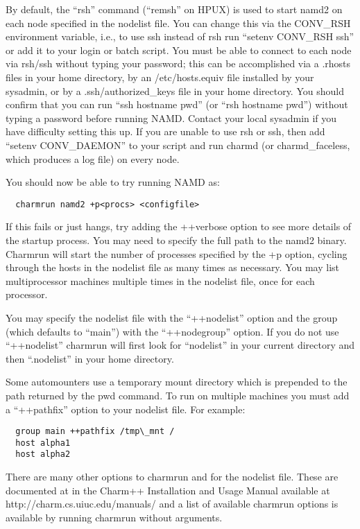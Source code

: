 By default, the ``rsh'' command (``remsh'' on HPUX) is used to start namd2
on each node specified in the nodelist file.  You can change this via
the CONV\_RSH environment variable, i.e., to use ssh instead of rsh run
``setenv CONV\_RSH ssh'' or add it to your login or batch script.  You
must be able to connect to each node via rsh/ssh without typing your
password; this can be accomplished via a .rhosts files in your home
directory, by an /etc/hosts.equiv file installed by your sysadmin, or
by a .ssh/authorized\_keys file in your home directory.  You should
confirm that you can run ``ssh hostname pwd'' (or ``rsh hostname pwd'')
without typing a password before running NAMD.  Contact your local
sysadmin if you have difficulty setting this up.  If you are unable to
use rsh or ssh, then add ``setenv CONV\_DAEMON'' to your script and run 
charmd (or charmd\_faceless, which produces a log file) on every node.

You should now be able to try running NAMD as:

\begin{verbatim}
  charmrun namd2 +p<procs> <configfile>
\end{verbatim}

If this fails or just hangs, try adding the ++verbose option to see
more details of the startup process.  You may need to specify the full
path to the namd2 binary.  Charmrun will start the number of processes
specified by the +p option, cycling through the hosts in the nodelist
file as many times as necessary.  You may list multiprocessor machines
multiple times in the nodelist file, once for each processor.

You may specify the nodelist file with the ``++nodelist'' option and the
group (which defaults to ``main'') with the ``++nodegroup'' option.  If
you do not use ``++nodelist'' charmrun will first look for ``nodelist''
in your current directory and then ``.nodelist'' in your home directory.

Some automounters use a temporary mount directory which is prepended
to the path returned by the pwd command.  To run on multiple machines
you must add a ``++pathfix'' option to your nodelist file.  For example:

\begin{verbatim}
  group main ++pathfix /tmp\_mnt /
  host alpha1
  host alpha2
\end{verbatim}

There are many other options to charmrun and for the nodelist file.
These are documented at in the Charm++ Installation and Usage Manual
available at http://charm.cs.uiuc.edu/manuals/ and a list of available
charmrun options is available by running charmrun without arguments.

